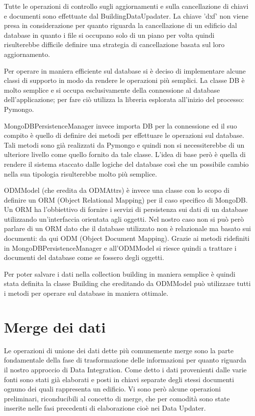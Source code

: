 \documentclass[12pt]{report}
\begin{document}
Tutte le operazioni di controllo sugli aggiornamenti e sulla cancellazione di chiavi e documenti sono effettuate dal BuildingDataUpadater.
La chiave 'dxf' non viene presa in considerazione per quanto riguarda la cancellazione di un edificio dal database in quanto i file si occupano solo di un piano per volta quindi risulterebbe difficile definire una strategia di cancellazione basata sul loro aggiornamento.    

\vspace{5mm} %

Per operare in maniera efficiente sul database si è deciso di implementare alcune classi di supporto in modo da rendere le operazioni più semplici.
La classe DB è molto semplice e si occupa esclusivamente della connessione al database dell'applicazione; per fare ciò utilizza la libreria esplorata all'inizio del processo: Pymongo.

MongoDBPersistenceManager invece importa DB per la connessione ed il suo compito è quello di definire dei metodi per effettuare le operazioni sul database.
Tali metodi sono già realizzati da Pymongo e quindi non si necessiterebbe di un ulteriore livello come quello fornito da tale classe.
L'idea di base però è quella di rendere il sistema staccato dalle logiche del database così che un possibile cambio nella sua tipologia risulterebbe molto più semplice.

ODMModel (che eredita da ODMAttrs) è invece una classe con lo scopo di definire un ORM (Object Relational Mapping) per il caso specifico di MongoDB.
Un ORM ha l'obbiettivo di fornire i servizi di persistenza sui dati di un database utilizzando un'interfaccia orientata agli oggetti.
Nel nostro caso non si può però parlare di un ORM dato che il database utilizzato non è relazionale ma basato sui documenti: da qui ODM (Object Document Mapping).
Grazie ai metodi ridefiniti in MongoDBPersistenceManager e all'ODMModel si riesce quindi a trattare i documenti del database come se fossero degli oggetti.

Per poter salvare i dati nella collection building in maniera semplice è quindi stata definita la classe Building che ereditando da ODMModel può utilizzare tutti i metodi per operare sul database in maniera ottimale.


\newpage
\section{Merge dei dati}

Le operazioni di unione dei dati dette più comunemente merge sono la parte fondamentale della fase di trasformazione delle informazioni per quanto riguarda il nostro approccio di Data Integration.
Come detto i dati provenienti dalle varie fonti sono stati già elaborati e posti in chiavi separate degli stessi documenti ognuno dei quali rappresenta un edificio.
Vi sono però alcune operazioni preliminari, riconducibili al concetto di merge, che per comodità sono state inserite nelle fasi precedenti di elaborazione cioè nei Data Updater.
\end{document}
